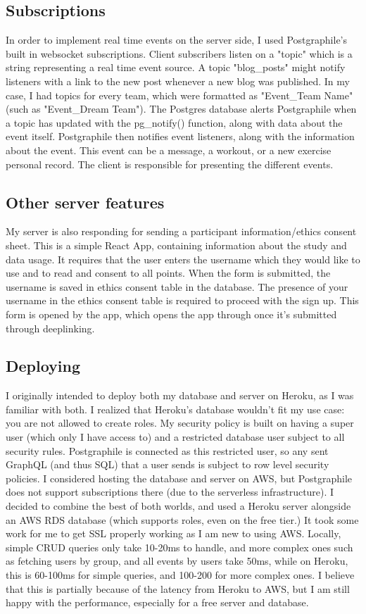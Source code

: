 \documentclass{l4proj}
\begin{document}
\subsection{Subscriptions}
In order to implement real time events on the server side, I used Postgraphile's built in websocket subscriptions. Client subscribers listen on a "topic" which is a string representing a real time event source. A topic "blog\_posts" might notify listeners with a link to the new post whenever a new blog was published. In my case, I had topics for every team, which were formatted as "Event\_{Team Name}" (such as "Event\_Dream Team"). The Postgres database alerts Postgraphile when a topic has updated with the pg\_notify() function, along with data about the event itself. Postgraphile then notifies event listeners, along with the information about the event. This event can be a message, a workout, or a new exercise personal record. The client is responsible for presenting the different events. 

\subsection{Other server features}
My server is also responding for sending a participant information/ethics consent sheet. This is a simple React App, containing information about the study and data usage. It requires that the user enters the username which they would like to use and to read and consent to all points. When the form is submitted, the username is saved in ethics consent table in the database. The presence of your username in the ethics consent table is required to proceed with the sign up. This form is opened by the app, which opens the app through once it's submitted through deeplinking. 

\subsection{Deploying}
I originally intended to deploy both my database and server on Heroku, as I was familiar with both. I realized that Heroku's database wouldn't fit my use case: you are not allowed to create roles. My security policy is built on having a super user (which only I have access to) and a restricted database user subject to all security rules. Postgraphile is connected as this restricted user, so any sent GraphQL (and thus SQL) that a user sends is subject to row level security policies. I considered hosting the database and server on AWS, but Postgraphile does not support subscriptions there (due to the serverless infrastructure). I decided to combine the best of both worlds, and used a Heroku server alongside an AWS RDS database (which supports roles, even on the free tier.) It took some work for me to get SSL properly working as I am new to using AWS. Locally, simple CRUD queries only take 10-20ms to handle, and more complex ones such as fetching users by group, and all events by users take 50ms, while on Heroku, this is 60-100ms for simple queries, and 100-200 for more complex ones. I believe that this is partially because of the latency from Heroku to AWS, but I am still happy with the performance, especially for a free server and database.
\end{document}
